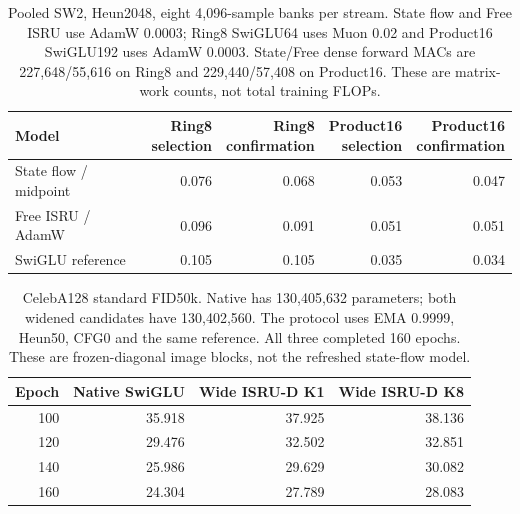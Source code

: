 \begin{table}[H]
\centering\small
\begin{tabular}{@{}lrrrr@{}}
\toprule
Model & \shortstack{Ring8\\selection} & \shortstack{Ring8\\confirmation} & \shortstack{Product16\\selection} & \shortstack{Product16\\confirmation}\\
\midrule
State flow / midpoint & 0.076 & 0.068 & 0.053 & 0.047\\
Free ISRU / AdamW & 0.096 & 0.091 & 0.051 & 0.051\\
SwiGLU reference & 0.105 & 0.105 & 0.035 & 0.034\\
\bottomrule
\end{tabular}
\caption{Pooled SW2, Heun2048, eight 4,096-sample banks per stream. State flow and Free ISRU use AdamW 0.0003; Ring8 SwiGLU64 uses Muon 0.02 and Product16 SwiGLU192 uses AdamW 0.0003. State/Free dense forward MACs are 227,648/55,616 on Ring8 and 229,440/57,408 on Product16. These are matrix-work counts, not total training FLOPs.}
\label{tab:ordinary}
\end{table}
\begin{table}[H]
\centering\small
\begin{tabular}{@{}rrrr@{}}
\toprule
Epoch & Native SwiGLU & Wide ISRU-D K1 & Wide ISRU-D K8\\
\midrule
100 & 35.918 & 37.925 & 38.136\\
120 & 29.476 & 32.502 & 32.851\\
140 & 25.986 & 29.629 & 30.082\\
160 & 24.304 & 27.789 & 28.083\\
\bottomrule
\end{tabular}
\caption{CelebA128 standard FID50k. Native has 130,405,632 parameters; both widened candidates have 130,402,560. The protocol uses EMA 0.9999, Heun50, CFG0 and the same reference. All three completed 160 epochs. These are frozen-diagonal image blocks, not the refreshed state-flow model.}
\label{tab:image}
\end{table}
